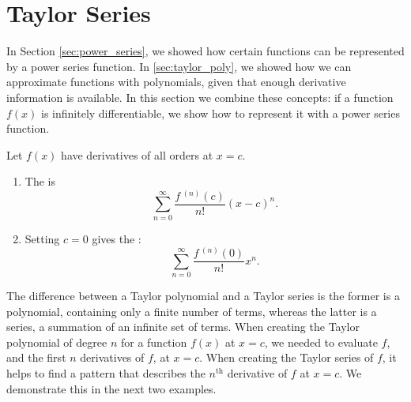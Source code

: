 \section{Taylor Series}\label{sec:taylor_series}

In Section \ref{sec:power_series}, we showed how certain functions can be represented by a power series function. In \ref{sec:taylor_poly}, we showed how we can approximate functions with polynomials, given that enough derivative information is available. In this section we combine these concepts: if a function $f(x)$ is infinitely differentiable, we show how to represent it with a power series function.

{Let $f(x)$ have derivatives of all orders at $x=c$.
\begin{enumerate}
	\item The  is
	$$\sum_{n=0}^\infty \frac{f\,^{(n)}(c)}{n!}(x-c)^n.$$
	\item	Setting $c=0$ gives the :
	$$\sum_{n=0}^\infty \frac{f\,^{(n)}(0)}{n!}x^n.$$
\end{enumerate}
}

The difference between a Taylor polynomial and a Taylor series is the former is a polynomial, containing only a finite number of terms, whereas the latter is a series, a summation of an infinite set of terms. When creating the Taylor polynomial of degree $n$ for a function $f(x)$ at $x=c$, we needed to evaluate $f$, and the first $n$ derivatives of $f$, at $x=c$. When creating the Taylor series of $f$, it helps to find a pattern that describes the $n^\text{th}$ derivative of $f$ at $x=c$. We demonstrate this in the next two examples.\\

